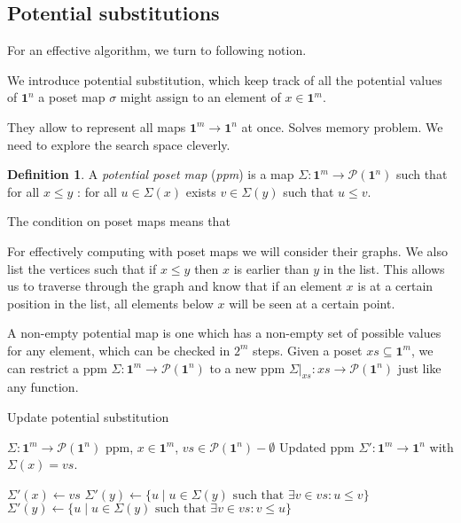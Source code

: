\documentclass[11pt]{article}
\theoremstyle{definition}
\newtheorem{definition}{Definition}
\newcommand{\mname}[1]{\textit{{#1}}}
\newcommand{\pint}[1]{\mathbf{1}^{#1}}
\newcommand{\restrict}[2]{{#1}|_{#2}}
\newcommand{\pow}[1]{\mathcal{P}({#1})}
\begin{document}
\subsection{Potential substitutions}

For an effective algorithm, we turn to following notion.

We introduce potential substitution, which keep track of all the potential
values of $\pint{n}$ a poset map $\sigma$ might assign to an element of $x \in \pint{m}$.

They allow to represent all maps $\pint{m} \to \pint{n}$ at once.
Solves memory problem. We need to explore the search space cleverly.

\begin{definition}
  A \mname{potential poset map} (\mname{ppm}) is a map $\Sigma : \pint{m} \to \pow{\pint{n}}$
  such that for all $x \leq y$ : for all $u \in \Sigma(x)$ exists $v \in
  \Sigma(y)$ such that $u \leq v$.
\end{definition}

The condition on poset maps means that 


For effectively computing with poset maps we will consider their graphs. We also
list the vertices such that if $x \leq y$ then $x$ is earlier than $y$ in the
list. This allows us to traverse through the graph and know that if an element
$x$ is at a certain position in the list, all elements below $x$ will be seen at
a certain point.

A non-empty potential map is one which has a non-empty set of possible values
for any element, which can be checked in $2^m$ steps. Given a poset $xs
\subseteq \pint{m}$, we can restrict a ppm $\Sigma : \pint{m} \to \pow{\pint{n}}$ to a
new ppm $\restrict{\Sigma}{xs} : xs \to \pow{\pint{n}}$ just like any function.

\begin{algorithm}[H]
  \caption{Update potential substitution}\label{alg:simple}
  \begin{algorithmic}
    \Require $\Sigma : \pint{m} \to \pow{\pint{n}}$ ppm, $x \in
    \pint{m}$, $vs \in \pow{\pint{n}} - \emptyset$
    \Ensure Updated ppm $\Sigma' : \pint{m} \to \pint{n}$ with $\Sigma(x) = vs$.

    \For{$y \gets \pint{m}$}
    \State $\Sigma'(x) \gets vs$
    \State $\Sigma'(y) \gets \{ u \mid u \in \Sigma(y) \text{ such that } \exists
    v \in vs : u \leq v \} $
    \State $\Sigma'(y) \gets \{ u \mid u \in \Sigma(y) \text{ such that } \exists
    v \in vs : v \leq u \} $
    \EndIf
    \EndFor
    \State {}
    \EndProcedure
  \end{algorithmic}
\end{algorithm}
\end{document}
